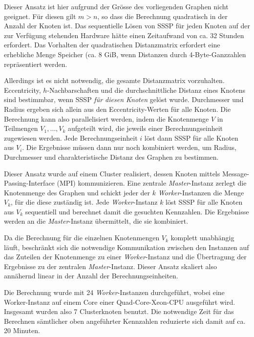 Dieser Ansatz ist hier aufgrund der Gr\"osse des vorliegenden Graphen
nicht geeignet. F\"ur diesen gilt $m > n$, so dass die Berechnung
quadratisch in der Anzahl der Knoten ist. Das sequentielle L\"osen von
SSSP f\"ur jeden Knoten auf der zur Verf\"ugung stehenden Hardware
h\"atte einen Zeitaufwand von ca. 32 Stunden erfordert. Das Vorhalten
der quadratischen Distanzmatrix erfordert eine erhebliche Menge
Speicher (ca. 8 GiB, wenn Distanzen durch 4-Byte-Ganzzahlen
repr\"asentiert werden.

Allerdings ist es nicht notwendig, die gesamte Distanzmatrix
vorzuhalten. Eccentricity, $h$-Nachbarschaften und die
durchschnittliche Distanz eines Knotens sind bestimmbar, wenn SSSP
\emph{f\"ur diesen Knoten} gel\"ost wurde. Durchmesser und Radius
ergeben sich allein aus den Eccentricity-Werten f\"ur alle Knoten. Die
Berechnung kann also parallelisiert werden, indem die Knotenmenge $V$
in Teilmengen $V_1, \dots, V_k$ aufgeteilt wird, die jeweils einer
Berechnungseinheit zugewiesen werden. Jede Berechnungseinheit $i$
l\"ost dann SSSP f\"ur alle Knoten aus $V_i$. Die Ergebnisse m\"ussen
dann nur noch kombiniert werden, um Radius, Durchmesser und
charakteristische Distanz des Graphen zu bestimmen.

Dieser Ansatz wurde auf einem Cluster realisiert, dessen Knoten
mittels Message-Passing-Interface (MPI) kommunizieren. Eine zentrale
\emph{Master}-Instanz zerlegt die Knotenmenge des Graphen und schickt
jeder der $k$ \emph{Worker}-Instanzen die Menge $V_k$, f\"ur die diese
zust\"andig ist. Jede \emph{Worker}-Instanz $k$ l\"ost SSSP f\"ur alle
Knoten aus $V_k$ sequentiell und berechnet damit die gesuchten
Kennzahlen. Die Ergebnisse werden an die \emph{Master}-Instanz
\"ubermittelt, die sie kombiniert.

Da die Berechnung f\"ur die einzelnen Knotenmengen $V_k$ komplett
unabh\"angig l\"auft, beschr\"ankt sich die notwendige Kommunikation
zwischen den Instanzen auf das Zuteilen der Knotenmenge zu einer
\emph{Worker}-Instanz und die \"Ubertragung der Ergebnisse zu der
zentralen \emph{Master}-Instanz. Dieser Ansatz skaliert also
ann\"ahernd linear in der Anzahl der Berechnungseinheiten.

Die Berechnung wurde mit 24 \emph{Worker}-Instanzen durchgef\"uhrt,
wobei eine Worker-Instanz auf einem Core einer Quad-Core-Xeon-CPU
ausgef\"uhrt wird. Insgesamt wurden also 7 Clusterknoten benutzt. Die
notwendige Zeit f\"ur das Berechnen s\"amtlicher oben angef\"uhrter
Kennzahlen reduzierte sich damit auf ca. 20 Minuten.

